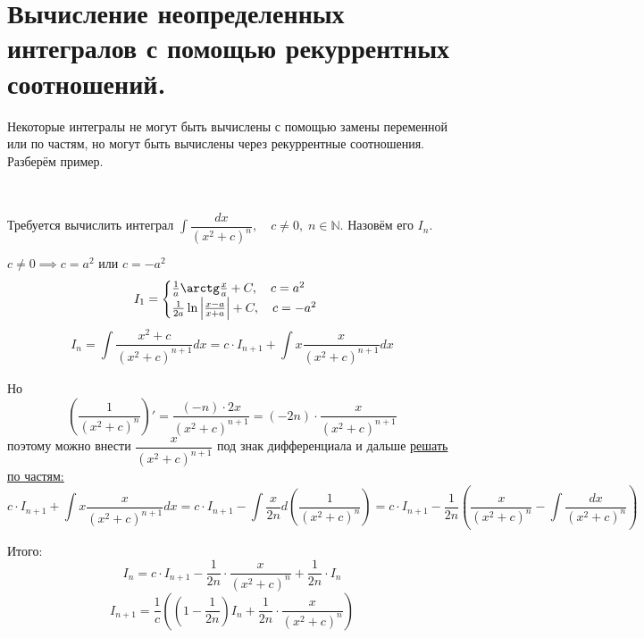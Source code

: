 \documentclass[../main.tex]{subfiles}
\begin{document}
\newpage
\section{Вычисление неопределенных интегралов с помощью рекуррентных соотношений.}
Некоторые интегралы не могут быть вычислены с помощью замены переменной или по частям, но могут быть вычислены через рекуррентные соотношения. 
Разберём пример. 
\begin{example}
    
    \hypertarget{ex:int_recur}{~}

    Требуется вычислить интеграл \( \displaystyle\int\limits_{ }^{ } \dfrac{ dx}{ \left( x^2+c\right)^n},\quad c \neq 0,\; n \in \mathbb{N} \). Назовём его \( I_n\).

    \( c \neq 0 \implies c=a^2\text{ или }c=-a^2\)
    \begin{equation*}
        I_1=
        \begin{cases}
            \frac{ 1}{ a} \arctg \frac{ x}{ a} +C,\quad c=a^2\\
            \frac{ 1}{ 2a} \ln \left| \frac{ x-a}{ x+a} \right|+C,\quad c=-a^2
        \end{cases}
    \end{equation*}
    \[ I_n= \displaystyle\int\limits_{ }^{ } \dfrac{ x^2+c}{ \left( x^2+c\right)^{n+1}} dx=c \cdot I_{n+1}+ \displaystyle\int\limits_{ }^{ } x \dfrac{ x}{ \left( x^2+c\right)^{n+1}} dx\]

    Но 
    \[ \left(\dfrac{ 1}{ \left( x^2+c\right)^{n}}\right)'= \dfrac{ (-n)\cdot2x}{ \left( x^2+c\right)^{n+1}}=\left( -2n\right) \cdot  \dfrac{ x}{ \left( x^2+c\right)^{n+1}}\]
    поэтому можно внести \( \dfrac{ x}{ \left( x^2+c\right)^{n+1}}\) под знак дифференциала и дальше \hyperlink{thm:undef_by_parts}{решать по частям:}
    \[ c \cdot I_{n+1}+ \displaystyle\int\limits_{ }^{ } x \dfrac{ x}{ \left( x^2+c\right)^{n+1}} dx=c \cdot I_{n+1}- \displaystyle\int\limits_{ }^{ } \dfrac{ x}{ 2n} d\left( \dfrac{ 1}{ \left( x^2+c\right)^{n}} \right) =c \cdot I_{n+1}- \dfrac{ 1}{ 2n} \left( \dfrac{ x}{ \left( x^2+c\right)^n} - \displaystyle\int\limits_{ }^{ } \dfrac{ dx}{ \left( x^2+c\right)^n} \right)\]

    Итого:
    \[ I_n=c \cdot I_{n+1}- \dfrac{ 1}{ 2n} \cdot \dfrac{ x}{ \left( x^2+c\right)^n} + \dfrac{ 1}{ 2n} \cdot I_n\]
    \[ \boxed{I_{n+1}= \dfrac{ 1}{ c} \left( \left( 1- \dfrac{ 1}{ 2n} \right)I_n + \dfrac{ 1}{ 2n} \cdot \dfrac{ x}{ \left( x^2+c\right)^n} \right)}\]
\end{example}
\end{document}
